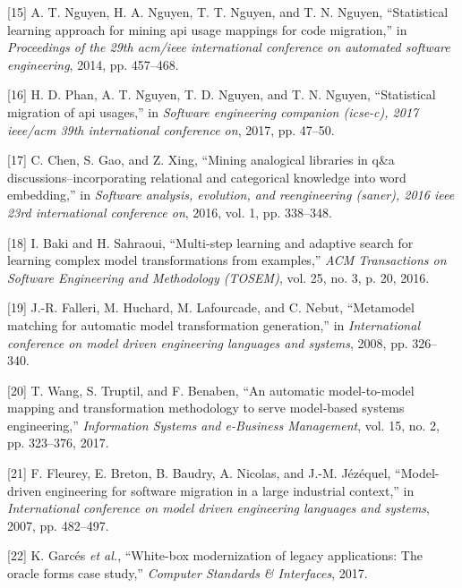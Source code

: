 \documentclass[11pt,]{article}
\begin{document}
\leavevmode\hypertarget{ref-nguyen2014statistical}{}%
{[}15{]} A. T. Nguyen, H. A. Nguyen, T. T. Nguyen, and T. N. Nguyen,
``Statistical learning approach for mining api usage mappings for code
migration,'' in \emph{Proceedings of the 29th acm/ieee international
conference on automated software engineering}, 2014, pp. 457--468.

\leavevmode\hypertarget{ref-phan2017statistical}{}%
{[}16{]} H. D. Phan, A. T. Nguyen, T. D. Nguyen, and T. N. Nguyen,
``Statistical migration of api usages,'' in \emph{Software engineering
companion (icse-c), 2017 ieee/acm 39th international conference on},
2017, pp. 47--50.

\leavevmode\hypertarget{ref-chen2016mining}{}%
{[}17{]} C. Chen, S. Gao, and Z. Xing, ``Mining analogical libraries in
q\&a discussions--incorporating relational and categorical knowledge
into word embedding,'' in \emph{Software analysis, evolution, and
reengineering (saner), 2016 ieee 23rd international conference on},
2016, vol. 1, pp. 338--348.

\leavevmode\hypertarget{ref-baki2016multi}{}%
{[}18{]} I. Baki and H. Sahraoui, ``Multi-step learning and adaptive
search for learning complex model transformations from examples,''
\emph{ACM Transactions on Software Engineering and Methodology (TOSEM)},
vol. 25, no. 3, p. 20, 2016.

\leavevmode\hypertarget{ref-falleri2008metamodel}{}%
{[}19{]} J.-R. Falleri, M. Huchard, M. Lafourcade, and C. Nebut,
``Metamodel matching for automatic model transformation generation,'' in
\emph{International conference on model driven engineering languages and
systems}, 2008, pp. 326--340.

\leavevmode\hypertarget{ref-wang2017automatic}{}%
{[}20{]} T. Wang, S. Truptil, and F. Benaben, ``An automatic
model-to-model mapping and transformation methodology to serve
model-based systems engineering,'' \emph{Information Systems and
e-Business Management}, vol. 15, no. 2, pp. 323--376, 2017.

\leavevmode\hypertarget{ref-fleurey2007model}{}%
{[}21{]} F. Fleurey, E. Breton, B. Baudry, A. Nicolas, and J.-M.
Jézéquel, ``Model-driven engineering for software migration in a large
industrial context,'' in \emph{International conference on model driven
engineering languages and systems}, 2007, pp. 482--497.

\leavevmode\hypertarget{ref-garces2017white}{}%
{[}22{]} K. Garcés \emph{et al.}, ``White-box modernization of legacy
applications: The oracle forms case study,'' \emph{Computer Standards \&
Interfaces}, 2017.
\end{document}
